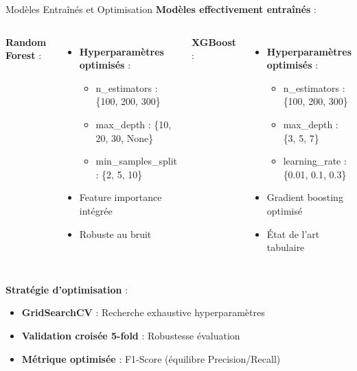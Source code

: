 \documentclass[11pt, aspectratio=169]{beamer}
\begin{document}
\begin{frame}{Modèles Entraînés et Optimisation}
  \textbf{\color{accent2} Modèles effectivement entraînés} :
  
  \vspace{0.6em}
  
  \begin{columns}[T]
    \textbf{Random Forest} :
    \begin{itemize}
      \item \textbf{Hyperparamètres optimisés} :
      \begin{itemize}
        \item n\_estimators : \{100, 200, 300\}
        \item max\_depth : \{10, 20, 30, None\}
        \item min\_samples\_split : \{2, 5, 10\}
      \end{itemize}
      \item Feature importance intégrée
      \item Robuste au bruit
    \end{itemize}
    
    \textbf{XGBoost} :
    \begin{itemize}
      \item \textbf{Hyperparamètres optimisés} :
      \begin{itemize}
        \item n\_estimators : \{100, 200, 300\}
        \item max\_depth : \{3, 5, 7\}
        \item learning\_rate : \{0.01, 0.1, 0.3\}
      \end{itemize}
      \item Gradient boosting optimisé
      \item État de l'art tabulaire
    \end{itemize}
  \end{columns}
  
  \vspace{1em}
  
  \textbf{\color{accent2} Stratégie d'optimisation} :
  \begin{itemize}
    \item \textbf{GridSearchCV} : Recherche exhaustive hyperparamètres
    \item \textbf{Validation croisée 5-fold} : Robustesse évaluation
    \item \textbf{Métrique optimisée} : F1-Score (équilibre Precision/Recall)
  \end{itemize}
\end{frame}
\end{document}
